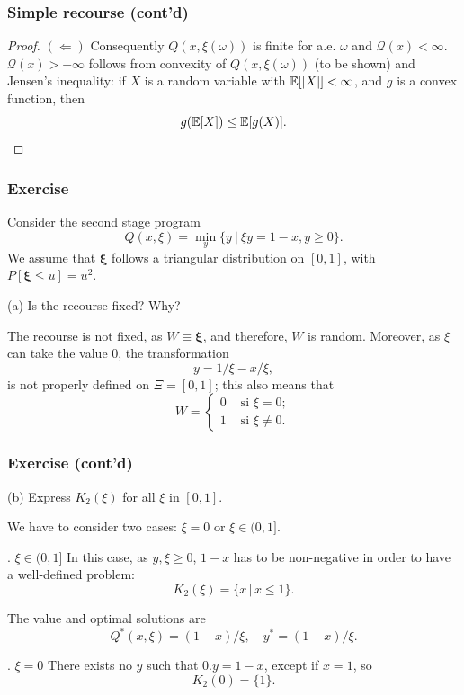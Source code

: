 \documentclass{beamer}
\def\bxi{\boldsymbol\xi}
\def\bxi{\boldsymbol\xi}
\begin{document}
\begin{frame}
\frametitle{Simple recourse (cont'd)}

\begin{proof}
{\bf $(\Leftarrow)$}
Consequently $Q(x,\xi(\omega))$ is finite for a.e. $\omega$ and $\mathcal{Q}(x) < \infty$.
$\mathcal{Q}(x) > -\infty$ follows from convexity of $Q(x,\xi(\omega))$ (to be shown) and Jensen's inequality:  if $X$ is a random variable with ${\mathbb{E}}[|X|] < \infty$, and $g$ is a convex function, then
$$
g({\mathbb{E}}[X]) \leq {\mathbb{E}}[g(X)].
$$
\end{proof}

\end{frame}

\begin{frame}
\frametitle{Exercise}
	
Consider the second stage program
\[
Q(x, \xi) = \min_y \lbrace y \ |\ \xi y = 1-x, y \geq 0 \rbrace.
\]
We assume that $\bxi$ follows a triangular distribution on $[0,1]$, with $P[\bxi \leq u] = u^2$.
	
\mbox{}
	
{\blue (a)}
Is the recourse fixed? Why?
	
\mbox{}
	
The recourse is not fixed, as $W \equiv \bxi$, and therefore, $W$ is random.
Moreover, as $\xi$ can take the value 0, the transformation
\[
y = 1/\xi - x/\xi,
\]
is not properly defined on $\Xi = [0,1]$; this also means that
\[
W =
\begin{cases}
0 & \mbox{ si } \xi = 0; \\
1 & \mbox{ si } \xi \ne 0.
\end{cases}
\]
	
\end{frame}

\begin{frame}
\frametitle{Exercise (cont'd)}
	
{\blue (b)} Express $K_2(\xi)$ for all $\xi$ in $[0,1]$.
	
\mbox{}
	
We have to consider two cases: $\xi = 0$ or $\xi \in (0,1]$.
	
\mbox{}
	
{. $\xi \in (0,1]$} In this case, as $y, \xi \geq 0$, $1-x$ has to be non-negative in order to have a well-defined problem:
\[
K_2(\xi) = \lbrace x\,|\, x \leq 1 \rbrace.
\]

The value and optimal solutions are
\[
Q^*(x,\xi) = (1-x)/\xi,\quad y^*= (1-x)/\xi.
\]
	
{. $\xi=0$} There exists no $y$ such that $0.y = 1-x$, except if $x = 1$, so
\[
K_2(0) = \lbrace 1 \rbrace.
\]
	
\end{frame}
\end{document}
